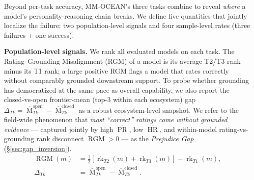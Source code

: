 \documentclass{llmxive}
\providecommand{\benchname}{MM-OCEAN}
\providecommand{\gapname}{Rating--Grounding Misalignment}
\providecommand{\gapinv}{Prejudice Gap}
\begin{document}
Beyond per-task accuracy, \benchname{}'s three tasks combine to reveal \emph{where} a model's personality-reasoning chain breaks. We define five quantities that jointly localize the failure: two population-level signals and four sample-level rates (three failures + one success).

\noindent\textbf{Population-level signals.} We rank all evaluated models on each task. The \gapname{} (RGM) of a model is its average T2/T3 rank minus its T1 rank; a large positive RGM flags a model that rates correctly without comparably grounded downstream support. To probe whether grounding has democratized at the same pace as overall capability, we also report the closed-vs-open frontier-mean (top-3 within each ecosystem) gap $\Delta_{Tk}\!=\!\overline{\operatorname{M}}_{Tk}^{\text{open}}\!-\!\overline{\operatorname{M}}_{Tk}^{\text{closed}}$ as a robust ecosystem-level snapshot. We refer to the field-wide phenomenon that \emph{most ``correct'' ratings come without grounded evidence} --- captured jointly by high $\overline{\operatorname{PR}}$, low $\overline{\operatorname{HR}}$, and within-model rating-vs-grounding rank disconnect $\operatorname{RGM}\!>\!0$ --- as the \emph{\gapinv{}} (\S\ref{sec:gap_inversion}).
\begin{align}
\operatorname{RGM}(m) &= \tfrac{1}{2}\!\left[\operatorname{rk}_{T2}(m)+\operatorname{rk}_{T3}(m)\right] - \operatorname{rk}_{T1}(m), \label{eq:rgm}\\[-1pt]
\Delta_{Tk} &= \overline{\operatorname{M}}_{Tk}^{\text{open}} - \overline{\operatorname{M}}_{Tk}^{\text{closed}}. \label{eq:delta}
\end{align}
\vspace{-0.4cm}
\end{document}
